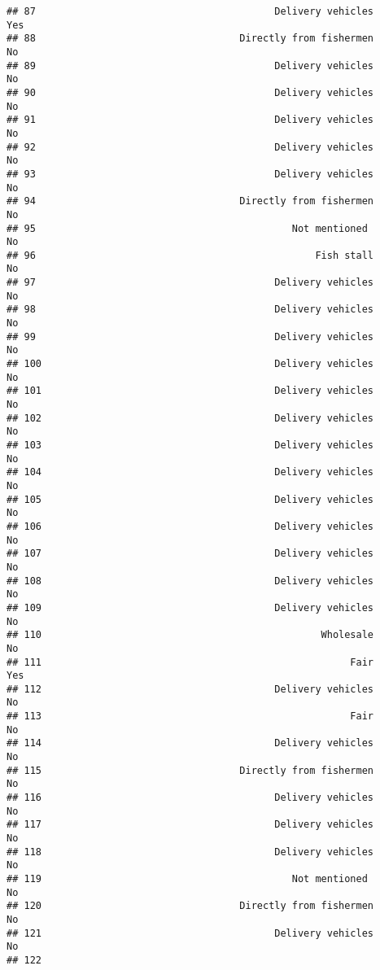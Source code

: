\documentclass[
]{article}
\begin{document}
\begin{verbatim}
## 87                                         Delivery vehicles       Yes
## 88                                   Directly from fishermen        No
## 89                                         Delivery vehicles        No
## 90                                         Delivery vehicles        No
## 91                                         Delivery vehicles        No
## 92                                         Delivery vehicles        No
## 93                                         Delivery vehicles        No
## 94                                   Directly from fishermen        No
## 95                                            Not mentioned         No
## 96                                                Fish stall        No
## 97                                         Delivery vehicles        No
## 98                                         Delivery vehicles        No
## 99                                         Delivery vehicles        No
## 100                                        Delivery vehicles        No
## 101                                        Delivery vehicles        No
## 102                                        Delivery vehicles        No
## 103                                        Delivery vehicles        No
## 104                                        Delivery vehicles        No
## 105                                        Delivery vehicles        No
## 106                                        Delivery vehicles        No
## 107                                        Delivery vehicles        No
## 108                                        Delivery vehicles        No
## 109                                        Delivery vehicles        No
## 110                                                Wholesale        No
## 111                                                     Fair       Yes
## 112                                        Delivery vehicles        No
## 113                                                     Fair        No
## 114                                        Delivery vehicles        No
## 115                                  Directly from fishermen        No
## 116                                        Delivery vehicles        No
## 117                                        Delivery vehicles        No
## 118                                        Delivery vehicles        No
## 119                                           Not mentioned         No
## 120                                  Directly from fishermen        No
## 121                                        Delivery vehicles        No
## 122                                                                   

\end{verbatim}
\end{document}
